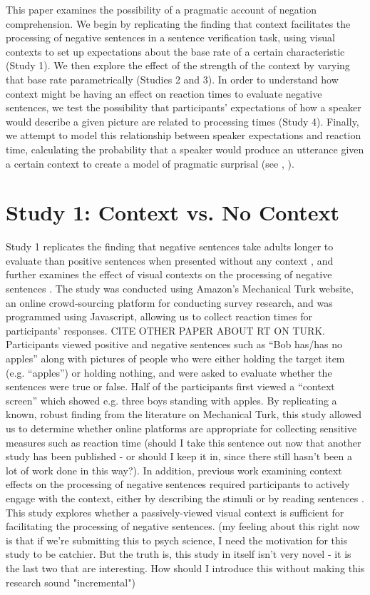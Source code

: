 \documentclass[10pt,letterpaper]{article}
\begin{document}
This paper examines the possibility of a pragmatic account of negation comprehension.  We begin by replicating the finding that context facilitates the processing of negative sentences in a sentence verification task, using visual contexts to set up expectations about the base rate of a certain characteristic (Study 1).  We then explore the effect of the strength of the context by varying that base rate parametrically (Studies 2 and 3).  In order to understand how context might be having an effect on reaction times to evaluate negative sentences, we test the possibility that participants' expectations of how a speaker would describe a given picture are related to processing times (Study 4).  Finally, we attempt to model this relationship between speaker expectations and reaction time, calculating the probability that a speaker would produce an utterance given a certain context to create a model of pragmatic surprisal (see , ).  

\section{Study 1: Context vs. No Context}
Study 1 replicates the finding that negative sentences take adults longer to evaluate than positive sentences when presented without any context \cite{hclark1972, carpenter1975, just1971, just1976}, and further examines the effect of visual contexts on the processing of negative sentences \cite{wason1965}.  The study was conducted using Amazon's Mechanical Turk website, an online crowd-sourcing platform for conducting survey research, and was programmed using Javascript, allowing us to collect reaction times for participants' responses.  CITE OTHER PAPER ABOUT RT ON TURK.  Participants viewed positive and negative sentences such as ``Bob has/has no apples'' along with pictures of people who were either holding the target item (e.g. ``apples'') or holding nothing, and were asked to evaluate whether the sentences were true or false.  Half of the participants first viewed a ``context screen'' which showed e.g. three boys standing with apples.  By replicating a known, robust finding from the literature on Mechanical Turk, this study allowed us to determine whether online platforms are appropriate for collecting sensitive measures such as reaction time (should I take this sentence out now that another study has been published - or should I keep it in, since there still hasn't been a lot of work done in this way?).  In addition, previous work examining context effects on the processing of negative sentences required participants to actively engage with the context, either by describing the stimuli \cite{wason1965} or by reading sentences \cite{dale2011, glenberg1999, ludtke2006}.  This study explores whether a passively-viewed visual context is sufficient for facilitating the processing of negative sentences.  (my feeling about this right now is that if we're submitting this to psych science, I need the motivation for this study to be catchier.  But the truth is, this study in itself isn't very novel - it is the last two that are interesting.  How should I introduce this without making this research sound "incremental")
\end{document}
